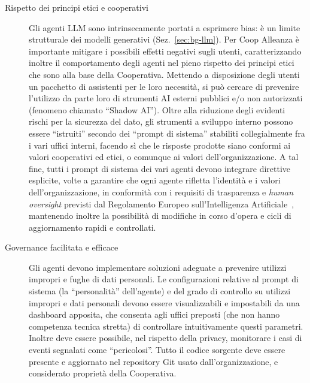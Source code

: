 \begin{description}

  \item[Rispetto dei principi etici e cooperativi]
    Gli agenti LLM sono intrinsecamente portati a esprimere bias: è un limite strutturale dei modelli generativi (Sez.~\ref{sec:bg-llm}).
    Per Coop Alleanza è importante mitigare i possibili effetti negativi sugli utenti, caratterizzando inoltre il comportamento
    degli agenti nel pieno rispetto dei principi etici che sono alla base della Cooperativa.
    Mettendo a disposizione degli utenti un pacchetto di assistenti per le loro necessità, si può cercare di 
    prevenire l'utilizzo da parte loro di strumenti AI esterni pubblici e/o non autorizzati (fenomeno chiamato ``Shadow AI'').
    Oltre alla riduzione degli evidenti rischi per la sicurezza del dato, gli strumenti a sviluppo interno possono essere ``istruiti'' 
    secondo dei ``prompt di sistema'' stabiliti collegialmente fra i vari uffici interni, facendo sì
    che le risposte prodotte siano conformi ai valori cooperativi ed etici, o comunque ai valori dell'organizzazione. 
    A tal fine, tutti i prompt di sistema dei vari agenti devono integrare direttive esplicite, volte a  
    garantire che ogni agente rifletta l'identità e i valori dell'organizzazione, 
    in conformità con i requisiti di trasparenza e \emph{human oversight} previsti dal 
    Regolamento Europeo sull'Intelligenza Artificiale~\cite{eu2024aiact}, 
    mantenendo inoltre la possibilità di modifiche in corso d'opera e cicli di aggiornamento rapidi e controllati.

  \item[Governance facilitata e efficace]
    Gli agenti devono implementare soluzioni adeguate a prevenire utilizzi impropri e fughe di dati personali.
    Le configurazioni relative al prompt di sistema (la ``personalità'' dell'agente) e del grado di controllo su utilizzi impropri e 
    dati personali devono essere visualizzabili e impostabili da una dashboard apposita,
    che consenta agli uffici preposti (che non hanno competenza tecnica stretta) di controllare intuitivamente questi parametri. 
    Inoltre deve essere possibile, nel rispetto della privacy, monitorare i casi di eventi segnalati come ``pericolosi''.
    Tutto il codice sorgente deve essere presente e aggiornato nel repository Git usato dall'organizzazione, e considerato 
    proprietà della Cooperativa.


\end{description}
